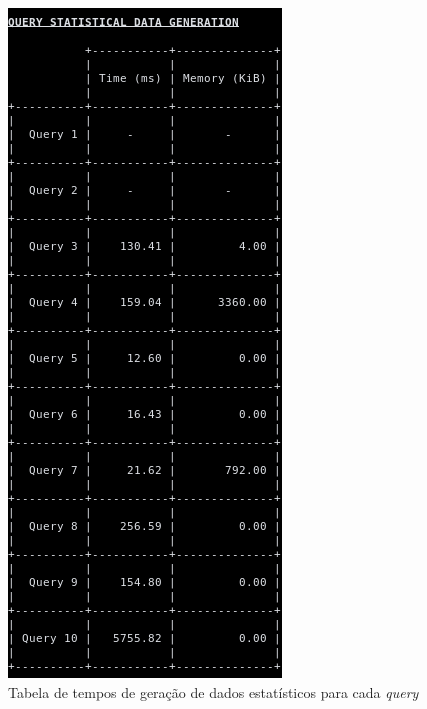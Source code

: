\documentclass[12pt, a4paper]{article}
\begin{document}
\begin{figure}[H]
    \centering
    \includegraphics[scale=0.6]{res-fase2/testing_screenshots/statistics.png}
    \caption{Tabela de tempos de geração de dados estatísticos para cada \emph{query}}
    \label{fig:query-screenshot}
\end{figure}
\end{document}
